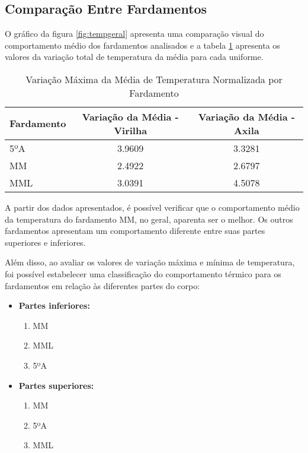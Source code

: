     \subsection{Comparação Entre Fardamentos}
        O gráfico da figura \ref{fig:tempgeral} apresenta uma comparação visual do comportamento médio dos 
        fardamentos analisados e a tabela \ref{tab:maxmedia} apresenta os valores da variação total de 
        temperatura da média para cada uniforme.


        \begin{table}[H]
            \centering
            \begin{tabular}{lcc}
            \hline
            Fardamento & Variação da Média - Virilha & Variação da Média - Axila \\
            \hline
            5ºA & 3.9609 & 3.3281 \\ 
            MM & 2.4922 & 2.6797 \\ 
            MML & 3.0391 & 4.5078 \\ 
            \hline
            \end{tabular}
            \caption{Variação Máxima da Média de Temperatura Normalizada por Fardamento}
            \label{tab:maxmedia}
            \end{table}

        A partir dos dados apresentados, é possível verificar que o comportamento médio da temperatura 
        do fardamento \acrshort{MM}, no geral, aparenta ser o melhor. Os outros fardamentos 
        apresentam um comportamento diferente entre suas partes superiores e inferiores.

        Além disso, ao avaliar os valores de variação máxima e mínima de temperatura, foi possível estabelecer 
        uma classificação do comportamento térmico para os fardamentos em relação às diferentes partes do corpo:       

        \begin{itemize}
            \item \textbf{Partes inferiores:}
            \begin{enumerate}[label=\Roman*.] %
            \item \acrlong{MM}
            \item \acrlong{MML}
            \item 5ºA
            \end{enumerate}

        
            \item \textbf{Partes superiores:}
            \begin{enumerate}[label=\Roman*.] %
            \item \acrlong{MM}
            \item 5ºA
            \item \acrlong{MML}
            \end{enumerate}

        
            \end{itemize}
            
